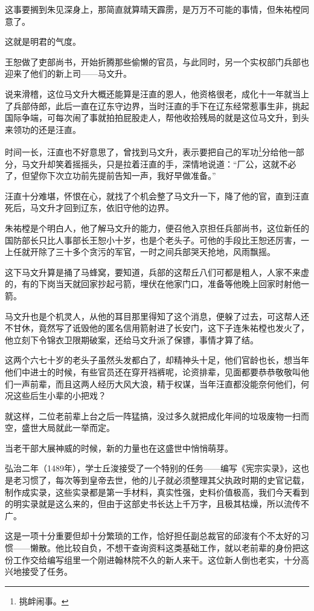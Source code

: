 \begin{multicols}{\theparacolNo}
这事要搁到朱见深身上，那简直就算晴天霹雳，是万万不可能的事情，但朱祐樘同意了。

这就是明君的气度。

王恕做了吏部尚书，开始折腾那些偷懒的官员，与此同时，另一个实权部门兵部也迎来了他们的新上司——马文升。

说来滑稽，这位马文升大概还能算是汪直的恩人，他资格很老，成化十一年就当上了兵部侍郎，此后一直在辽东守边界，当时汪直的手下在辽东经常惹事生非，挑起国际争端，可每次闹了事就拍拍屁股走人，帮他收拾残局的就是这位马文升，到头来领功的还是汪直。

时间一长，汪直也不好意思了，曾找到马文升，表示要把自己的军功\footnote{挑衅闹事。}分给他一部分，马文升却笑着摇摇头，只是拉着汪直的手，深情地说道：“厂公，这就不必了，但望你下次立功前先提前告知一声，我好早做准备。”

汪直十分难堪，怀恨在心，就找了个机会整了马文升一下，降了他的官，直到汪直死后，马文升才回到辽东，依旧守他的边界。

朱祐樘是个明白人，他了解马文升的能力，便召他入京担任兵部尚书，这位新任的国防部长只比人事部长王恕小十岁，也是个老头子。可他的手段比王恕还厉害，一上任就开除了三十多个贪污的军官，一时之间兵部哭天抢地，风雨飘摇。

这下马文升算是捅了马蜂窝，要知道，兵部的这帮丘八们可都是粗人，人家不来虚的，有的下岗当天就回家抄起弓箭，埋伏在他家门口，准备等他晚上回家时射他一箭。

马文升也是个机灵人，从他的耳目那里得知了这个消息，便躲了过去，可这帮人还不甘休，竟然写了诋毁他的匿名信用箭射进了长安门，这下子连朱祐樘也发火了，他立刻下令锦衣卫限期破案，还给马文升派了保镖，事情才算了结。

这两个六七十岁的老头子虽然头发都白了，却精神头十足，他们官龄也长，想当年他们中进士的时候，有些官员还在穿开裆裤呢，论资排辈，见面都要恭恭敬敬叫他们一声前辈，而且这两人经历大风大浪，精于权谋，当年汪直都没能奈何他们，何况这些后生小辈的小把戏？

就这样，二位老前辈上台之后一阵猛搞，没过多久就把成化年间的垃圾废物一扫而空，盛世大局就此一举而定。

当老干部大展神威的时候，新的力量也在这盛世中悄悄萌芽。

弘治二年（1489年），学士丘浚接受了一个特别的任务——编写《宪宗实录》，这也是老习惯了，每次等到皇帝去世，他的儿子就必须整理其父执政时期的史官记载，制作成实录，这些实录都是第一手材料，真实性强，史料价值极高，我们今天看到的明实录就是这么来的，但由于这部史书长达上千万字，且极其枯燥，所以流传不广。

这是一项十分重要但却十分繁琐的工作，恰好担任副总裁官的邱浚有个不太好的习惯——懒散。他比较自负，不想干查询资料这类基础工作，就以老前辈的身份把这份工作交给编写组里一个刚进翰林院不久的新人来干。这位新人倒也老实，十分高兴地接受了任务。


\end{multicols}

